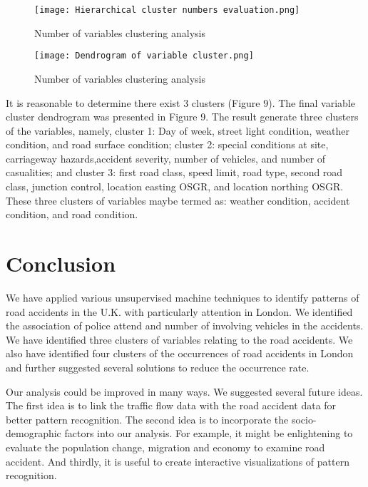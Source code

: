 \documentclass{neu_handout}
\begin{document}
\begin{figure}[!htb]
  \texttt{[image: Hierarchical cluster numbers evaluation.png]}
  \caption{Number of variables clustering analysis}\label{fig:hclust_number}
\endminipage\hfill
{}
  \texttt{[image: Dendrogram of variable cluster.png]}
  \caption{Number of variables clustering analysis}\label{fig:hclust}
\endminipage
\end{figure}

It is reasonable to determine there exist 3 clusters (Figure 9). The final variable cluster dendrogram was presented in Figure 9. The result generate three clusters of the variables, namely, cluster 1: Day of week, street light condition, weather condition, and road surface condition; cluster 2: special conditions at site, carriageway hazards,accident severity, number of vehicles, and number of casualities; and cluster 3: first road class, speed limit, road type, second road class, junction control, location easting OSGR, and location northing OSGR. These three clusters of variables maybe termed as: weather condition, accident condition, and road condition.

\section{Conclusion}

We have applied various unsupervised machine techniques to identify patterns of road accidents in the U.K. with particularly attention in London. We identified the association of police attend and number of involving vehicles in the accidents. We have identified three clusters of variables relating to the road accidents. We also have identified four clusters of the occurrences of road accidents in London and further suggested several solutions to reduce the occurrence rate. 

Our analysis could be improved in many ways. We suggested several future ideas. The first idea is to link the traffic flow data with the road accident data for better pattern recognition. The second idea is to incorporate the socio-demographic factors into our analysis. For example, it might be enlightening to evaluate the population change, migration and economy to examine road accident. And thirdly, it is useful to create interactive visualizations of pattern recognition.
\end{document}
